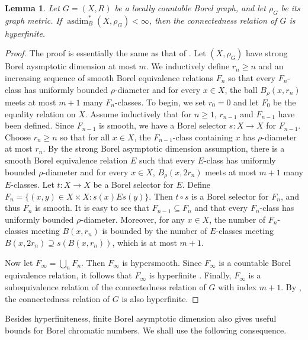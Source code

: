 \documentclass[11pt, reqno, a4paper]{amsart}
\newtheorem{lemma}[theorem]{Lemma}
\theoremstyle{definition}
\theoremstyle{plain}
\begin{document}
\begin{lemma} \label{lem:hyp}
Let $G=(X,R)$ be a locally countable Borel graph, and let $\rho_G$ be its graph
metric. If $\operatorname{asdim}^*_B(X,\rho_G)<\infty$,
then the connectedness relation of $G$ is hyperfinite.
\end{lemma}

\begin{proof} 
The proof is essentially the same as that of \cite[Theorem 7.1]{ConleyJacksonMarksSewardTuckerDrob2023}. Let $(X, \rho_G)$ have strong Borel aysmptotic dimension at most $m$. We inductively define $r_n\geq n$ and an increasing sequence of smooth Borel equivalence relations $F_n$ so that every $F_n$-class has uniformly bounded $\rho$-diameter and for every $x\in X$, the ball $B_\rho(x, r_n)$ meets at most $m+1$ many $F_n$-classes. To begin, we set $r_0=0$ and let $F_0$ be the equality relation on $X$. Assume inductively that for $n\geq 1$, $r_{n-1}$ and $F_{n-1}$ have been defined. Since $F_{n-1}$ is smooth, we have a Borel selector $s\colon X\to X$ for $F_{n-1}$. Choose $r_n\geq n$ so that for all $x\in X$, the $F_{n-1}$-class containing $x$ has $\rho$-diameter at most $r_n$. By the strong Borel asymptotic dimension assumption, there is a smooth Borel equivalence relation $E$ such that every $E$-class has uniformly bounded $\rho$-diameter and for every $x\in X$, $B_\rho(x, 2r_n)$ meets at most $m+1$ many $E$-classes. Let $t\colon X\to X$ be a Borel selector for $E$. Define $F_n=\{(x,y)\in X\times X\colon s(x)Es(y)\}$. Then $t\circ s$ is a Borel selector for $F_n$, and thus $F_n$ is smooth. It is easy to see that $F_{n-1}\subseteq F_n$ and that every $F_n$-class has uniformly bounded $\rho$-diameter. Moreover, for any $x\in X$, the number of $F_n$-classes meeting $B(x, r_n)$ is bounded by the number of $E$-classes meeting $B(x, 2r_n)\supseteq s(B(x, r_n))$, which is at most $m+1$. 

Now let $F_\infty=\bigcup_n F_n$. Then $F_\infty$ is hypersmooth. Since $F_\infty$ is a countable Borel equivalence relation, it follows that $F_\infty$ is hyperfinite \cite[Theorem 5.1 (3)]{DoughertyJacksonKechris1994}. Finally, $F_\infty$ is a subequivalence relation of the connectedness relation of $G$ with index $m+1$. By \cite[Proposition 1.3 (vii)]{JacksonKechrisLouveau2002}, the connectedness relation of $G$ is also hyperfinite.
\end{proof}

Besides hyperfiniteness, finite Borel asymptotic dimension also gives useful
bounds for Borel chromatic numbers. We shall use the following consequence.
\end{document}
